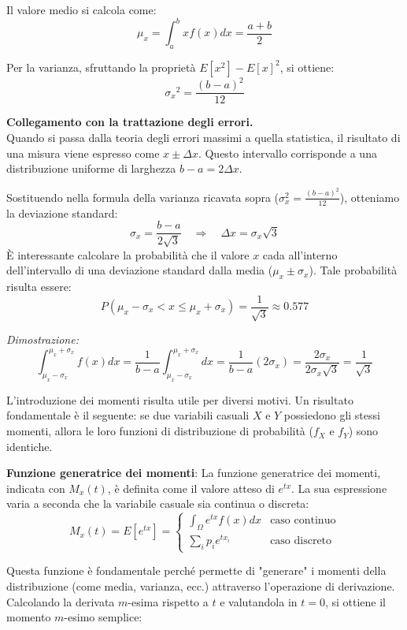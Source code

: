 \documentclass{article}
\theoremstyle{remark}
\begin{document}
Il valore medio si calcola come:
\[
\mu_x=\int_{a}^{b}x f(x) dx = \frac{a+b}{2}
\]


Per la varianza, sfruttando la proprietà $E[x^2]-{E[x]}^2$, si ottiene:
\[
{\sigma_x}^2 = \frac{{(b-a)^2}}{12}
\]


\begin{nota}
    \textbf{Collegamento con la trattazione degli errori.} \\
    Quando si passa dalla teoria degli errori massimi a quella statistica, il risultato di una misura viene espresso come $x \pm \Delta x$. Questo intervallo corrisponde a una distribuzione uniforme di larghezza $b-a = 2\Delta x$.

    Sostituendo nella formula della varianza ricavata sopra ($\sigma_x^2=\frac{(b-a)^2}{12}$), otteniamo la deviazione standard:
    \[
    \sigma_x=\frac{b-a}{2\sqrt{3}} \quad \Rightarrow \quad \Delta x = \sigma_x \sqrt{3}
    \]
    È interessante calcolare la probabilità che il valore $x$ cada all'interno dell'intervallo di una deviazione standard dalla media ($\mu_x \pm \sigma_x$). Tale probabilità risulta essere:
    \[
    P(\mu_x-\sigma_x < x \leq \mu_x + \sigma_x) = \frac{1}{\sqrt{3}} \approx 0.577
    \]
    
    \textit{Dimostrazione:}
    \[
    \int_{\mu_x-\sigma_x}^{\mu_x+\sigma_x} f(x)dx = \frac{1}{b-a}\int_{\mu_x-\sigma_x}^{\mu_x+\sigma_x} dx = \frac{1}{b-a} (2 \sigma_x) = \frac{2\sigma_x}{2\sigma_x\sqrt{3}} = \frac{1}{\sqrt{3}}
    \]
\end{nota}

\vspace{1 cm}




\vspace{1 cm}
L'introduzione dei momenti risulta utile per diversi motivi. Un risultato fondamentale è il seguente: se due variabili casuali $X$ e $Y$ possiedono gli stessi momenti, allora le loro funzioni di distribuzione di probabilità ($f_X$ e $f_Y$) sono identiche.

\begin{definizione}
    \textbf{Funzione generatrice dei momenti}:
        La funzione generatrice dei momenti, indicata con $M_x(t)$, è definita come il valore atteso di $e^{tx}$. La sua espressione varia a seconda che la variabile casuale sia continua o discreta:
    \[
    M_x(t) = E[e^{tx}] = 
    \begin{cases} 
    \displaystyle \int_\Omega e^{tx}f(x) dx & \text{caso continuo} \\[1em]
    \displaystyle \sum_i p_i e^{tx_i} & \text{caso discreto}
    \end{cases}
    \]
\end{definizione}
Questa funzione è fondamentale perché permette di "generare" i momenti della distribuzione (come media, varianza, ecc.) attraverso l'operazione di derivazione. Calcolando la derivata $m$-esima rispetto a $t$ e valutandola in $t=0$, si ottiene il momento $m$-esimo semplice:
\end{document}
